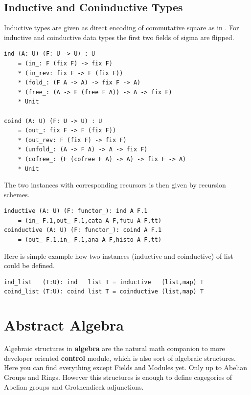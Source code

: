 \documentclass{article}
\begin{document}
\subsection{Inductive and Coninductive Types}

Inductive types are given as direct encoding of commutative square as in \cite{Wu13}.
For inductive and coinductive data types the first two fields of sigma are flipped.

\begin{lstlisting}[mathescape=true]
ind (A: U) (F: U -> U) : U
    = (in_: F (fix F) -> fix F)
    * (in_rev: fix F -> F (fix F))
    * (fold_: (F A -> A) -> fix F -> A)
    * (free_: (A -> F (free F A)) -> A -> fix F)
    * Unit

coind (A: U) (F: U -> U) : U
    = (out_: fix F -> F (fix F))
    * (out_rev: F (fix F) -> fix F)
    * (unfold_: (A -> F A) -> A -> fix F)
    * (cofree_: (F (cofree F A) -> A) -> fix F -> A)
    * Unit
\end{lstlisting}

The two instances with corresponding recursors is then given by recursion schemes.

\begin{lstlisting}[mathescape=true]
inductive (A: U) (F: functor_): ind A F.1
    = (in_ F.1,out_ F.1,cata A F,futu A F,tt)
coinductive (A: U) (F: functor_): coind A F.1
    = (out_ F.1,in_ F.1,ana A F,histo A F,tt)
\end{lstlisting}

Here is simple example how two instances (inductive and coinductive) of list could be defined.

\begin{lstlisting}[mathescape=true]
ind_list   (T:U): ind   list T = inductive   (list,map) T
coind_list (T:U): coind list T = coinductive (list,map) T
\end{lstlisting}

\section{Abstract Algebra}

Algebraic structures in {\bf algebra} are the natural math companion to
more developer oriented {\bf control} module, which is also sort of algebraic structures.
Here you can find everything except Fields and Modules yet. Only up to Abelian Groups and Rings.
However this structures is enough to define cagegories of Abelian groups and Grothendieck adjunctions.
\end{document}
